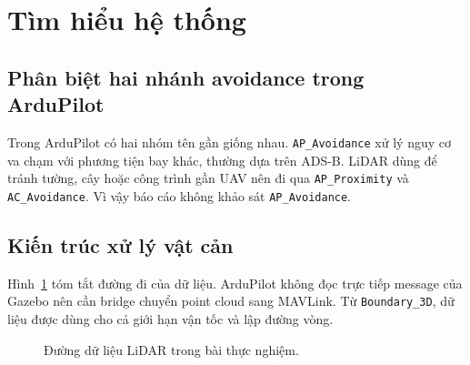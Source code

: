 \documentclass[11pt,a4paper]{article}
\begin{document}
\section{Tìm hiểu hệ thống}

\subsection{Phân biệt hai nhánh avoidance trong ArduPilot}

Trong ArduPilot có hai nhóm tên gần giống nhau. \texttt{AP\_Avoidance} xử lý nguy cơ va chạm với phương tiện bay khác, thường dựa trên ADS-B. LiDAR dùng để tránh tường, cây hoặc công trình gần UAV nên đi qua \texttt{AP\_Proximity} và \texttt{AC\_Avoidance}. Vì vậy báo cáo không khảo sát \texttt{AP\_Avoidance}.

\subsection{Kiến trúc xử lý vật cản}

Hình~\ref{fig:architecture} tóm tắt đường đi của dữ liệu. ArduPilot không đọc trực tiếp message của Gazebo nên cần bridge chuyển point cloud sang MAVLink. Từ \texttt{Boundary\_3D}, dữ liệu được dùng cho cả giới hạn vận tốc và lập đường vòng.

\begin{figure}[H]
\centering
{}
\caption{Đường dữ liệu LiDAR trong bài thực nghiệm.}
\label{fig:architecture}
\end{figure}
\end{document}
